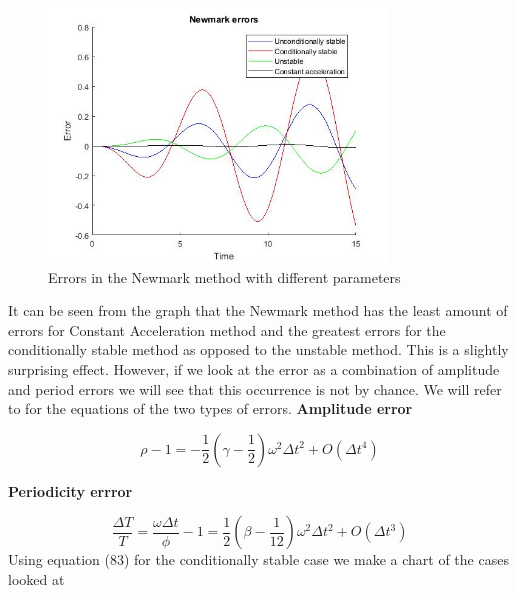 \documentclass{article}
\begin{document}
				\begin{figure}[h!]
   					 \centering
   					 \includegraphics[width=90mm]{pictures/untitled.jpg}
   					 \caption{Errors in the Newmark method with different parameters}
				            \label{fig17}
  				\end{figure}
It can be seen from the graph that the Newmark method has the least amount of errors for Constant Acceleration method and the greatest errors for the conditionally stable method as opposed to the unstable method. This is a slightly surprising effect. However, if we look at the error as a combination of amplitude and period errors we will see that this occurrence is not by chance. We will refer to \cite{Gerardin} for the equations of the two types of errors.
\newline
\textbf{Amplitude error}
				
				\begin{equation*}
					\rho - 1 = -\frac{1}{2}\left( \gamma - \frac{1}{2} \right)\omega^2\Delta t^2 + O(\Delta t^4)
				\end{equation*}

\textbf{Periodicity errror}

				\begin{equation*}
					\frac{\Delta T}{T} =\frac{\omega \Delta t}{\phi} - 1 = \frac{1}{2}\left( \beta - \frac{1}{12} \right)\omega^2\Delta t^2 + O(\Delta t^3)
				\end{equation*}
Using equation (83) for the conditionally stable case we make a chart of the cases looked at
\end{document}
